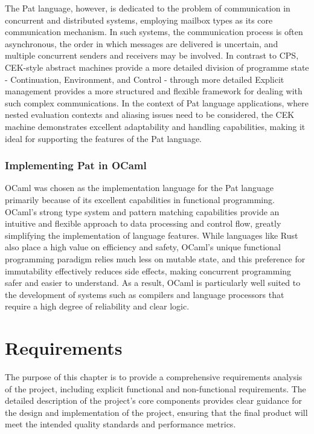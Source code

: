 \documentclass{l4proj}
\begin{document}
The Pat language, however, is dedicated to the problem of communication in concurrent and distributed systems, employing mailbox types as its core communication mechanism. In such systems, the communication process is often asynchronous, the order in which messages are delivered is uncertain, and multiple concurrent senders and receivers may be involved. In contrast to CPS, CEK-style abstract machines provide a more detailed division of programme state - Continuation, Environment, and Control - through more detailed Explicit management provides a more structured and flexible framework for dealing with such complex communications. In the context of Pat language applications, where nested evaluation contexts and aliasing issues need to be considered, the CEK machine demonstrates excellent adaptability and handling capabilities, making it ideal for supporting the features of the Pat language.

\subsection{Implementing Pat in OCaml}
OCaml was chosen as the implementation language for the Pat language primarily because of its excellent capabilities in functional programming. OCaml's strong type system and pattern matching capabilities provide an intuitive and flexible approach to data processing and control flow, greatly simplifying the implementation of language features. While languages like Rust also place a high value on efficiency and safety, OCaml's unique functional programming paradigm relies much less on mutable state, and this preference for immutability effectively reduces side effects, making concurrent programming safer and easier to understand. As a result, OCaml is particularly well suited to the development of systems such as compilers and language processors that require a high degree of reliability and clear logic.


\chapter{Requirements}

The purpose of this chapter is to provide a comprehensive requirements analysis of the project, including explicit functional and non-functional requirements. The detailed description of the project's core components provides clear guidance for the design and implementation of the project, ensuring that the final product will meet the intended quality standards and performance metrics.
\end{document}
